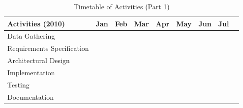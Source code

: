 %
%
\newcommand{\weekone}{\textbullet}
\newcommand{\weektwo}{\textbullet \textbullet}
\newcommand{\weekthree}{\textbullet \textbullet \textbullet}
\newcommand{\weekfour}{\textbullet \textbullet \textbullet \textbullet}

%
%

\begin{table}[ht]   %
\centering
\caption{Timetable of Activities (Part 1)} \vspace{0.25em}
\begin{tabular}{|p{2in}|c|c|c|c|c|c|c|c|} \hline
\centering Activities (2010) & Jan & Feb & Mar & Apr & May & Jun & Jul \\ \hline
Data Gathering	       		& ~~~\weektwo & \weekfour & \weekfour & \weekfour &  &  &  \\ \hline
Requirements Specification	&  &  & ~~~\weektwo & \weekthree~~ &  &  &  \\ \hline
Architectural Design   		&  &  &  & ~~\weekthree & \weekfour & \weektwo~~~ &  \\ \hline
Implementation		   		&  &  &  &  & ~~~\weektwo & \weekfour & \weekfour  \\ \hline
Testing 			   		&  &  &  &  &  &  & \weekfour \\ \hline
Documentation 		   		& ~~~\weektwo & \weekfour & \weekfour & \weekfour & \weekfour & \weekfour & \weekfour \\ \hline
\end{tabular}
\label{tab:timetableactivities1}
\end{table}

